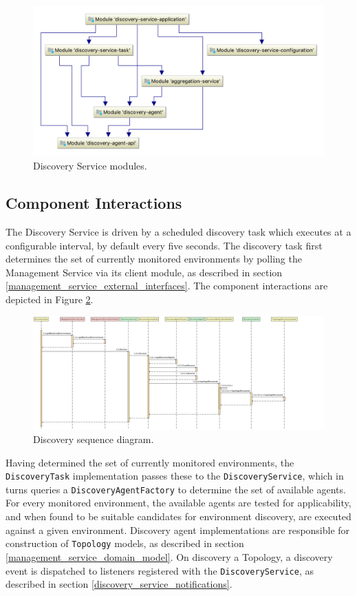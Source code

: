  \begin{figure}[H]
 	\centering  
 	\includegraphics[width=\linewidth]{figures/impl/discovery/modules.png}
 	\caption{Discovery Service modules.}
 	\label{discovery_svc_modules}
 \end{figure}

\subsection{Component Interactions}

The Discovery Service is driven by a scheduled discovery task which executes at a configurable interval, by default every five seconds. The discovery task first determines the set of currently monitored environments by polling the Management Service via its client module, as described in section \ref{management_service_external_interfaces}. The component interactions are depicted in Figure \ref{discovery_sync_task_sequence}.

\begin{figure}[H]
	\centering  
	\includegraphics[width=\linewidth]{figures/impl/discovery/discovery_sequence.png}
	\caption{Discovery sequence diagram.}
	\label{discovery_sync_task_sequence}
\end{figure}

Having determined the set of currently monitored environments, the \texttt{DiscoveryTask} implementation passes these to the \texttt{DiscoveryService}, which in turns queries a \texttt{DiscoveryAgentFactory} to determine the set of available agents. For every monitored environment, the available agents are tested for applicability, and when found to be suitable candidates for environment discovery, are executed against a given environment. Discovery agent implementations are responsible for construction of \texttt{Topology} models, as described in section \ref{management_service_domain_model}. On discovery a Topology, a discovery event is dispatched to listeners registered with the \texttt{DiscoveryService}, as described in section \ref{discovery_service_notifications}.

